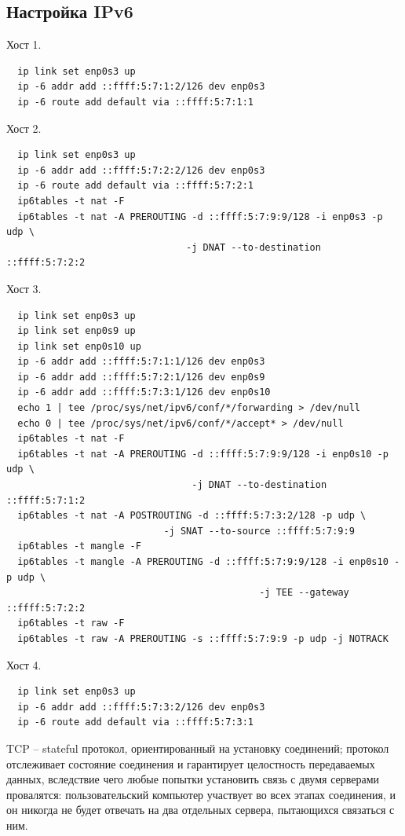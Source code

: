 \documentclass[11pt, a4paper] {ncc}
\begin{document}
    \subsection*{Настройка IPv6}
    Хост 1.
    \begin{verbatim}
  ip link set enp0s3 up
  ip -6 addr add ::ffff:5:7:1:2/126 dev enp0s3
  ip -6 route add default via ::ffff:5:7:1:1
    \end{verbatim}
    Хост 2.
    \begin{verbatim}
  ip link set enp0s3 up
  ip -6 addr add ::ffff:5:7:2:2/126 dev enp0s3
  ip -6 route add default via ::ffff:5:7:2:1
  ip6tables -t nat -F
  ip6tables -t nat -A PREROUTING -d ::ffff:5:7:9:9/128 -i enp0s3 -p udp \
                                -j DNAT --to-destination ::ffff:5:7:2:2
    \end{verbatim}
    Хост 3.
    \begin{verbatim}
  ip link set enp0s3 up
  ip link set enp0s9 up
  ip link set enp0s10 up
  ip -6 addr add ::ffff:5:7:1:1/126 dev enp0s3
  ip -6 addr add ::ffff:5:7:2:1/126 dev enp0s9
  ip -6 addr add ::ffff:5:7:3:1/126 dev enp0s10
  echo 1 | tee /proc/sys/net/ipv6/conf/*/forwarding > /dev/null
  echo 0 | tee /proc/sys/net/ipv6/conf/*/accept* > /dev/null
  ip6tables -t nat -F
  ip6tables -t nat -A PREROUTING -d ::ffff:5:7:9:9/128 -i enp0s10 -p udp \
                                 -j DNAT --to-destination ::ffff:5:7:1:2
  ip6tables -t nat -A POSTROUTING -d ::ffff:5:7:3:2/128 -p udp \
                            -j SNAT --to-source ::ffff:5:7:9:9
  ip6tables -t mangle -F
  ip6tables -t mangle -A PREROUTING -d ::ffff:5:7:9:9/128 -i enp0s10 -p udp \
                                             -j TEE --gateway ::ffff:5:7:2:2
  ip6tables -t raw -F
  ip6tables -t raw -A PREROUTING -s ::ffff:5:7:9:9 -p udp -j NOTRACK
    \end{verbatim}
    Хост 4.
    \begin{verbatim}
  ip link set enp0s3 up
  ip -6 addr add ::ffff:5:7:3:2/126 dev enp0s3
  ip -6 route add default via ::ffff:5:7:3:1
    \end{verbatim}


    TCP -- stateful протокол, ориентированный на установку соединений; протокол отслеживает состояние соединения
    и гарантирует целостность передаваемых данных, вследствие чего любые попытки установить связь с двумя
    серверами провалятся: пользовательский компьютер участвует во всех этапах соединения, 
    и он никогда не будет отвечать на два отдельных сервера, пытающихся связаться с ним.
\end{document}
